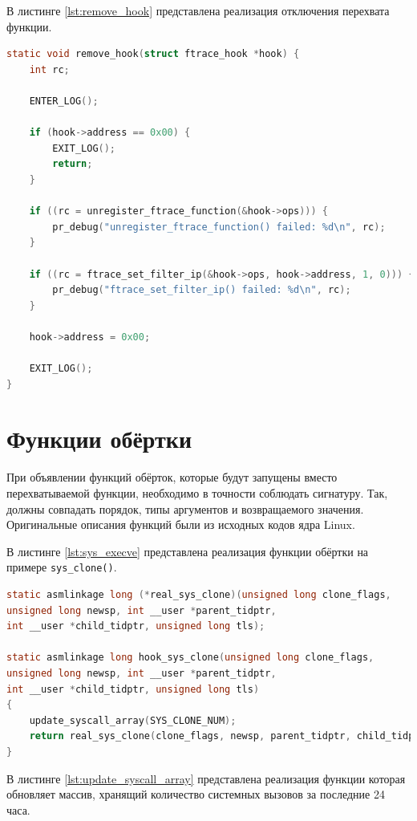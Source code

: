 В листинге \ref{lst:remove_hook} представлена реализация отключения перехвата функции.\\

\begin{lstlisting}[label=lst:remove_hook, caption=Реализация функции \texttt{remove\_hook()}, language=c]
static void remove_hook(struct ftrace_hook *hook) {
	int rc;
	
	ENTER_LOG();
	
	if (hook->address == 0x00) {
		EXIT_LOG();
		return;
	}
	
	if ((rc = unregister_ftrace_function(&hook->ops))) {
		pr_debug("unregister_ftrace_function() failed: %d\n", rc);
	}
	
	if ((rc = ftrace_set_filter_ip(&hook->ops, hook->address, 1, 0))) {
		pr_debug("ftrace_set_filter_ip() failed: %d\n", rc);
	}
	
	hook->address = 0x00;
	
	EXIT_LOG();
}
\end{lstlisting}

\section{Функции обёртки}

При объявлении функций обёрток, которые будут запущены вместо перехватываемой функции, необходимо в точности соблюдать сигнатуру. Так, должны совпадать порядок, типы аргументов и возвращаемого значения. Оригинальные описания функций были из исходных кодов ядра Linux. 

В листинге \ref{lst:sys_execve} представлена реализация функции обёртки на примере \texttt{sys\_clone()}.\\

\begin{lstlisting}[label=lst:sys_execve, caption=Реализация функции обёртки, language=c]
static asmlinkage long (*real_sys_clone)(unsigned long clone_flags,
unsigned long newsp, int __user *parent_tidptr,
int __user *child_tidptr, unsigned long tls);

static asmlinkage long hook_sys_clone(unsigned long clone_flags,
unsigned long newsp, int __user *parent_tidptr,
int __user *child_tidptr, unsigned long tls)
{
	update_syscall_array(SYS_CLONE_NUM);
	return real_sys_clone(clone_flags, newsp, parent_tidptr, child_tidptr, tls);
}
\end{lstlisting}

В листинге \ref{lst:update_syscall_array} представлена реализация функции которая обновляет массив, хранящий количество системных вызовов за последние 24 часа.\\

